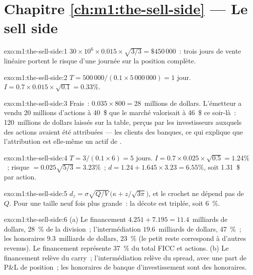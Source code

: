 \section*{Chapitre \ref{ch:m1:the-sell-side} --- Le sell side}

\begin{solution}{exo:m1:the-sell-side:1}
$30 \times 10^6 \times 0.015 \times \sqrt{3/3} = \$450\,000$~: trois jours de
vente linéaire portent le risque d'une journée sur la position complète.
\end{solution}

\begin{solution}{exo:m1:the-sell-side:2}
$T = 500\,000/(0.1 \times 5\,000\,000) = 1$ jour. $I = 0.7 \times 0.015 \times
\sqrt{0.1} = 0.33\%$.
\end{solution}

\begin{solution}{exo:m1:the-sell-side:3}
Frais~: $0.035 \times 800 = 28$~millions de dollars. L'émetteur a vendu 20 millions d'actions à
40~\$ que le marché valorisait à 46~\$ ce soir-là~: 120~millions de dollars laissés sur la
table, perçus par les investisseurs auxquels des actions avaient été attribuées --- les
clients des banques, ce qui explique que l'attribution est elle-même un actif de .
\end{solution}

\begin{solution}{exo:m1:the-sell-side:4}
$T = 3/(0.1\times 6) = 5$ jours. $I = 0.7 \times 0.025 \times \sqrt{0.5} =
1.24\%$~; risque $= 0.025\sqrt{5/3} = 3.23\%$~; $d = 1.24 + 1.645 \times 3.23 =
6.55\%$, soit 1.31~\$ par action.
\end{solution}

\begin{solution}{exo:m1:the-sell-side:5}
$d_z = \sigma\sqrt{Q/V}\,\bigl(\kappa + z/\sqrt{3\pi}\bigr)$, et le crochet
ne dépend pas de $Q$. Pour une taille neuf fois plus grande~: la décote est triplée, soit 6~\%.
\end{solution}

\begin{solution}{exo:m1:the-sell-side:6}
(a) Le financement $4.251 + 7.195 = 11.4$~milliards de dollars, 28~\% de la division~;
l'intermédiation $19.6$~milliards de dollars, 47~\%~; les honoraires $9.3$~milliards de dollars, 23~\% (le
petit reste correspond à d'autres revenus). Le financement représente 37~\% du total FICC et actions.
(b) Le financement relève du carry~; l'intermédiation relève du spread, avec une part de
P\&L de position~; les honoraires de banque d'investissement sont des honoraires.
\end{solution}

